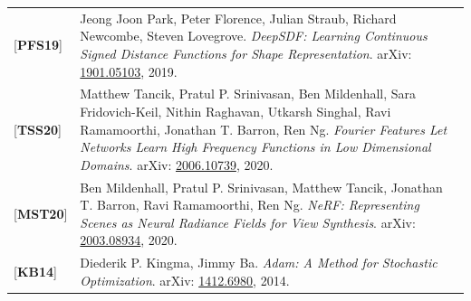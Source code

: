 \documentclass[12pt,a4paper]{article}
\theoremstyle{definition}
\begin{document}
\begin{tabular}{p{}p{}}
{[\textbf{PFS19}]}      & Jeong Joon Park, Peter Florence, Julian Straub, Richard Newcombe, Steven Lovegrove. \textit{DeepSDF: Learning Continuous Signed Distance Functions for Shape Representation}. arXiv: \href{https://arxiv.org/abs/1901.05103}{1901.05103}, 2019. \hypertarget{[PFS19]}{}\\
{[\textbf{TSS20}]}      & Matthew Tancik, Pratul P. Srinivasan, Ben Mildenhall, Sara Fridovich-Keil, Nithin Raghavan, Utkarsh Singhal, Ravi Ramamoorthi, Jonathan T. Barron, Ren Ng. \textit{Fourier Features Let Networks Learn High Frequency Functions in Low Dimensional Domains}. arXiv: \href{https://arxiv.org/abs/2006.10739}{2006.10739}, 2020. \hypertarget{[TSS20]}{}\\
{[\textbf{MST20}]}      & Ben Mildenhall, Pratul P. Srinivasan, Matthew Tancik, Jonathan T. Barron, Ravi Ramamoorthi, Ren Ng. \textit{NeRF: Representing Scenes as Neural Radiance Fields for View Synthesis}. arXiv: \href{https://arxiv.org/abs/2003.08934}{2003.08934}, 2020. \hypertarget{[MST20]}{}\\
{[\textbf{KB14}]}       & Diederik P. Kingma, Jimmy Ba. \textit{Adam: A Method for Stochastic Optimization}. arXiv: \href{https://arxiv.org/abs/1412.6980}{1412.6980}, 2014. \hypertarget{[KB14]}{}\\
\end{tabular}
\end{document}
